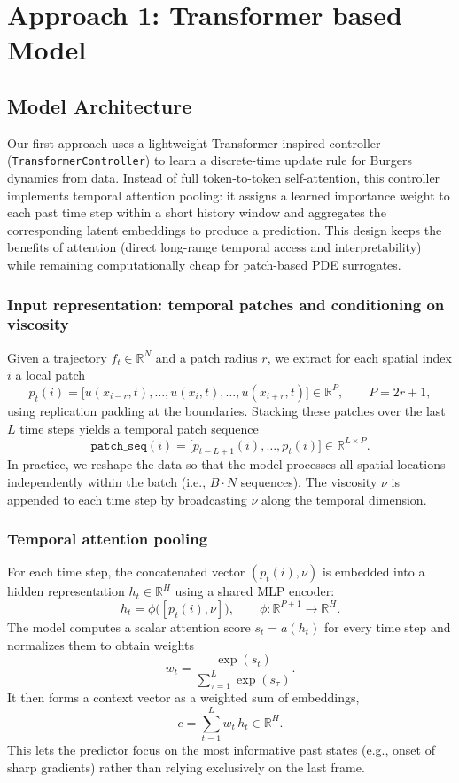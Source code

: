 \section{Approach 1: Transformer based Model}
\label{sec:approach1_transformer}

\subsection{Model Architecture}

Our first approach uses a lightweight Transformer-inspired controller (\texttt{TransformerController}) to learn a discrete-time update rule for Burgers dynamics from data. Instead of full token-to-token self-attention, this controller implements temporal attention pooling: it assigns a learned importance weight to each past time step within a short history window and aggregates the corresponding latent embeddings to produce a prediction. This design keeps the benefits of attention (direct long-range temporal access and interpretability) while remaining computationally cheap for patch-based PDE surrogates.

\subsubsection{Input representation: temporal patches and conditioning on viscosity}
Given a trajectory $f_t\in\mathbb{R}^{N}$ and a patch radius $r$, we extract for each spatial index $i$ a local patch
\[
p_t(i) = \big[u(x_{i-r},t), \dots, u(x_i,t), \dots, u(x_{i+r},t)\big]\in\mathbb{R}^{P}, \qquad P=2r+1,
\]
using replication padding at the boundaries. Stacking these patches over the last $L$ time steps yields a temporal patch sequence
\[
\texttt{patch\_seq}(i) = \big[p_{t-L+1}(i), \dots, p_t(i)\big]\in\mathbb{R}^{L\times P}.
\]
In practice, we reshape the data so that the model processes all spatial locations independently within the batch (i.e., $B\cdot N$ sequences). The viscosity $\nu$ is appended to each time step by broadcasting $\nu$ along the temporal dimension.

\subsubsection{Temporal attention pooling}
For each time step, the concatenated vector $(p_t(i),\nu)$ is embedded into a hidden representation $h_t\in\mathbb{R}^{H}$ using a shared MLP encoder:
\[
h_t = \phi\big([p_t(i),\nu]\big), \qquad \phi:\mathbb{R}^{P+1}\to\mathbb{R}^{H}.
\]
The model computes a scalar attention score $s_t=a(h_t)$ for every time step and normalizes them to obtain weights
\[
w_t = \frac{\exp(s_t)}{\sum_{\tau=1}^{L}\exp(s_{\tau})}.
\]
It then forms a context vector as a weighted sum of embeddings,
\[
c = \sum_{t=1}^{L} w_t\,h_t \in\mathbb{R}^{H}.
\]
This lets the predictor focus on the most informative past states (e.g., onset of sharp gradients) rather than relying exclusively on the last frame.

